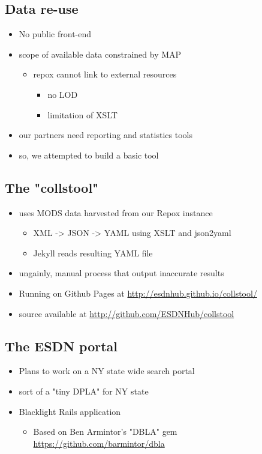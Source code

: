 \documentclass[11pt]{article}
\begin{document}
\subsection*{Data re-use}
\label{sec:org812a0c0}
\begin{itemize}
\item No public front-end
\item scope of available data constrained by MAP
\begin{itemize}
\item repox cannot link to external resources
\begin{itemize}
\item no LOD
\item limitation of XSLT
\end{itemize}
\end{itemize}
\item our partners need reporting and statistics tools
\item so, we attempted to build a basic tool
\end{itemize}

\subsection*{The "collstool"}
\label{sec:org99cdf0f}
\begin{itemize}
\item uses MODS data harvested from our Repox instance
\begin{itemize}
\item XML -> JSON -> YAML using XSLT and json2yaml
\item Jekyll reads resulting YAML file
\end{itemize}
\item ungainly, manual process that output inaccurate results
\item Running on Github Pages at \href{http://esdnhub.github.io/collstool/}{\url{http://esdnhub.github.io/collstool/}}
\item source available at \href{http://github.com/ESDNHub/collstool}{\url{http://github.com/ESDNHub/collstool}}
\end{itemize}

\subsection*{The ESDN portal}
\label{sec:org7ace97a}
\begin{itemize}
\item Plans to work on a NY state wide search portal
\item sort of a "tiny DPLA" for NY state
\item Blacklight Rails application
\begin{itemize}
\item Based on Ben Armintor's "DBLA" gem \href{https://github.com/barmintor/dbla}{\url{https://github.com/barmintor/dbla}}
\end{itemize}
\end{itemize}
\end{document}
